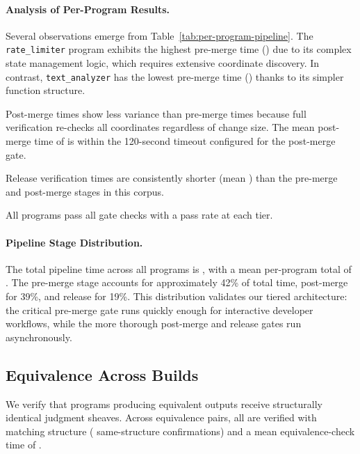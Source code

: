 \documentclass[11pt]{article}
\begin{document}
\paragraph{Analysis of Per-Program Results.}
Several observations emerge from Table~\ref{tab:per-program-pipeline}.
The \texttt{rate\_limiter} program exhibits the highest pre-merge time
(\ppLXVciratelimiterPre{}) due to its complex state management logic, which
requires extensive coordinate discovery. In contrast,
\texttt{text\_analyzer} has the lowest pre-merge time
(\ppLXVcitextanalyzerPre{}) thanks to its simpler function structure.

Post-merge times show less variance than pre-merge times because full
verification re-checks all coordinates regardless of change size. The mean
post-merge time of \ppLXVpostMean{} is within the 120-second timeout
configured for the post-merge gate.

Release verification times are consistently shorter (mean
\ppLXVreleaseMean{}) than the pre-merge and post-merge stages in this corpus.

All \ppLXVprogramCount{} programs pass all gate checks with a
\ppLXVgatePrePassPct{} pass rate at each tier.

\paragraph{Pipeline Stage Distribution.}
The total pipeline time across all programs is \ppLXVtotalTotal{}, with a
mean per-program total of \ppLXVtotalMean{}. The pre-merge stage accounts
for approximately 42\% of total time, post-merge for 39\%, and release for
19\%. This distribution validates our tiered architecture: the critical
pre-merge gate runs quickly enough for interactive developer workflows,
while the more thorough post-merge and release gates run asynchronously.

\subsection{Equivalence Across Builds}

We verify that programs producing equivalent outputs receive structurally
identical judgment sheaves. Across \compEquivPairs{} equivalence pairs, all
\compEquivBothVerified{} are verified with matching structure
(\compEquivSameStructure{} same-structure confirmations) and a mean
equivalence-check time of \compEquivMeanTime{}.

\end{document}
